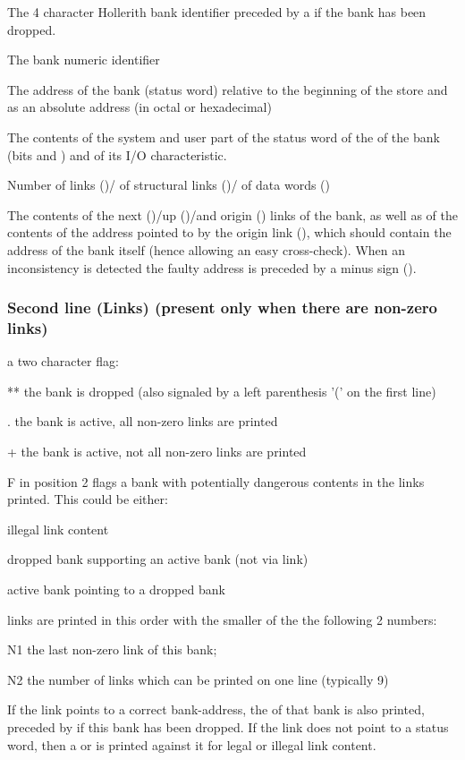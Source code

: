 \begin{OLc}
\item The 4 character Hollerith bank identifier preceded by a \Lit{(}
if the bank has been dropped.
\item The bank numeric identifier
\item The address of the bank (status word) relative to the beginning of
the store and as an absolute address (in octal or hexadecimal)
\item The contents of the system and user part of the status word of the
of the bank (bits  and ) and of its I/O characteristic.
\item Number of links ()/ of structural links
()/ of data words ()
\item The contents of the next ()/up ()/and origin ()
links of the bank,
as well as of the contents of the address pointed to by the origin link
(), which should contain
the address of the bank itself (hence allowing an easy cross-check).
When an inconsistency is detected the
faulty address is preceded by a minus sign (\Lit{-}).
\end{OLc}
\subsubsection*{Second line (Links) (present only when there are non-zero links)}
\begin{OL}
\item a two character flag:
\begin{DLttc}{12}
\item[**]the bank is dropped (also signaled by a left parenthesis '('
on the first line)
\item[.]the bank is active, all non-zero links are printed
\item[+]the bank is active, not all non-zero links are printed
\item[F]in position 2 flags a bank with potentially dangerous
contents in the links printed. This could be either:
\begin{ULc}
\item illegal link content
\item dropped bank supporting an active bank (not via  link)
\item active bank pointing to a dropped bank
\end{ULc}
\end{DLttc}
\item links  are printed in this order with  the smaller of the
the following 2 numbers:
\begin{DLttc}{12}
\item[N1] the last non-zero link of this bank;
\item[N2] the number of links which can be printed on one line
(typically 9)
\end{DLttc}
If the link points to a correct bank-address, the  of that
bank is also printed, preceded by \Lit{(} if this bank has been dropped.
If the link does not point to a status word, then a \Lit{-} or
\Lit{****} is printed against it for legal or illegal link content.
\end{OL}

